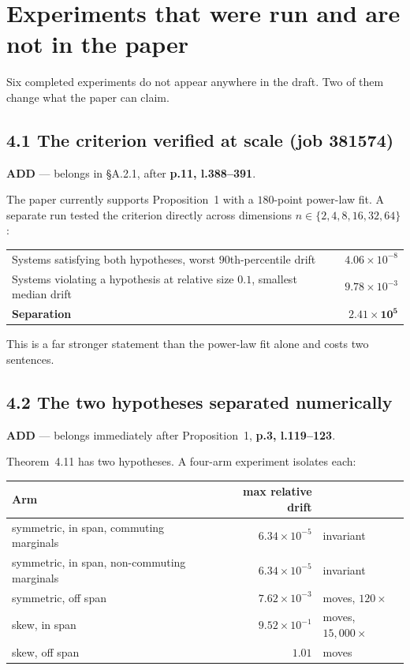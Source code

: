 \documentclass[11pt]{article}
\newcommand{\ADD}{\textcolor{add}{\textbf{ADD}}}
\newcommand{\pl}[2]{\textbf{p.#1, l.#2}}
\begin{document}
\section{Experiments that were run and are not in the paper}

Six completed experiments do not appear anywhere in the draft. Two of them change what the paper
can claim.

\subsection*{4.1 The criterion verified at scale (job 381574)}

\ADD{} --- belongs in \S A.2.1, after \pl{11}{388--391}.

The paper currently supports Proposition~1 with a $180$-point power-law fit. A separate run
tested the criterion directly across dimensions $n\in\{2,4,8,16,32,64\}$:

\begin{center}
\begin{tabular}{@{}lr@{}}
\toprule
Systems satisfying both hypotheses, worst $90$th-percentile drift & $4.06\times10^{-8}$\\
Systems violating a hypothesis at relative size $0.1$, smallest median drift & $9.78\times10^{-3}$\\
\textbf{Separation} & $\mathbf{2.41\times10^{5}}$\\
\bottomrule
\end{tabular}
\end{center}

This is a far stronger statement than the power-law fit alone and costs two sentences.

\subsection*{4.2 The two hypotheses separated numerically}

\ADD{} --- belongs immediately after Proposition~1, \pl{3}{119--123}.

Theorem~4.11 has two hypotheses. A four-arm experiment isolates each:

\begin{center}
\begin{tabular}{@{}lrl@{}}
\toprule
Arm & max relative drift & \\
\midrule
symmetric, in span, commuting marginals    & $6.34\times10^{-5}$ & invariant\\
symmetric, in span, non-commuting marginals& $6.34\times10^{-5}$ & invariant\\
symmetric, off span                        & $7.62\times10^{-3}$ & moves, $120\times$\\
skew, in span                              & $9.52\times10^{-1}$ & moves, $15{,}000\times$\\
skew, off span                             & $1.01$              & moves\\
\bottomrule
\end{tabular}
\end{center}
\end{document}
